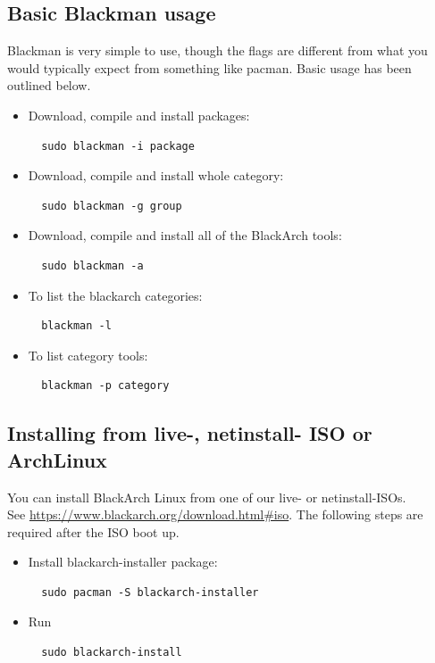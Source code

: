 \documentclass[a4paper, oneside,12pt]{scrartcl}
\begin{document}
\subsection{Basic Blackman usage} Blackman is very simple to use, though the flags are different from what you
would typically expect from something like pacman. Basic usage has been outlined below.
\begin{itemize}
\item Download, compile and install packages:
\begin{lstlisting}
  sudo blackman -i package
\end{lstlisting}

\item Download, compile and install whole category:
\begin{lstlisting}
  sudo blackman -g group
\end{lstlisting}

\item Download, compile and install all of the BlackArch tools:
\begin{lstlisting}
  sudo blackman -a
\end{lstlisting}

\item To list the blackarch categories:
\begin{lstlisting}
  blackman -l
\end{lstlisting}

\item To list category tools:
\begin{lstlisting}
  blackman -p category
\end{lstlisting}

\end{itemize}

\subsection{Installing from live-, netinstall- ISO or ArchLinux}
You can install BlackArch Linux from one of our live- or netinstall-ISOs.\\See
\url{https://www.blackarch.org/download.html#iso}. The following steps are
required after the ISO boot up.
\begin{itemize}
\item Install blackarch-installer package:
\begin{lstlisting}
  sudo pacman -S blackarch-installer
\end{lstlisting}

\item Run
\begin{lstlisting}
  sudo blackarch-install
\end{lstlisting}
\end{itemize}
\end{document}
